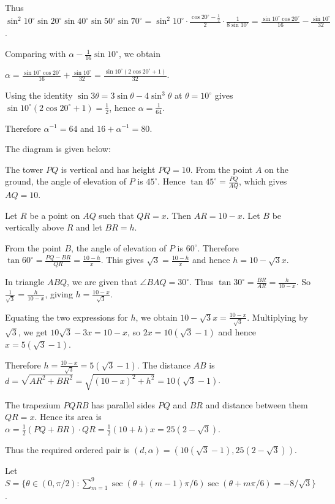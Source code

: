   Thus $\sin^2 10^\circ\sin20^\circ\sin40^\circ\sin50^\circ\sin70^\circ=\sin^2
  10^\circ\cdot\frac{\cos20^\circ-\tfrac12}{2}\cdot\frac{1}{8\sin10^\circ}=\frac{\sin10^\circ\cos20^\circ}{16}-\frac{\sin10^\circ}{32}$.

  Comparing with $\alpha-\frac{1}{16}\sin10^\circ$, we obtain

  $\alpha=\frac{\sin10^\circ\cos20^\circ}{16}+\frac{\sin10^\circ}{32}=\frac{\sin10^\circ(2\cos20^\circ+1)}{32}$.

  Using the identity $\sin3\theta=3\sin\theta-4\sin^3\theta$ at $\theta=10^\circ$ gives
  $\sin10^\circ(2\cos20^\circ+1)=\frac12$, hence $\alpha=\frac{1}{64}$.

  Therefore $\alpha^{-1}=64$ and $16+\alpha^{-1}=80$.
\item The diagram is given below:

  \startplacefigure
    \externalfigure[17_26.pdf]
  \stopplacefigure

  The tower $PQ$ is vertical and has height $PQ=10$.
  From the point $A$ on the ground, the angle of elevation of $P$ is $45^\circ$.
  Hence $\tan 45^\circ=\frac{PQ}{AQ}$, which gives $AQ=10$.

  Let $R$ be a point on $AQ$ such that $QR=x$.
  Then $AR=10-x$.
  Let $B$ be vertically above $R$ and let $BR=h$.

  From the point $B$, the angle of elevation of $P$ is $60^\circ$.
  Therefore $\tan 60^\circ=\frac{PQ-BR}{QR}=\frac{10-h}{x}$.
  This gives $\sqrt3=\frac{10-h}{x}$ and hence $h=10-\sqrt3 x$.

  In triangle $ABQ$, we are given that $\angle BAQ=30^\circ$.
  Thus $\tan 30^\circ=\frac{BR}{AR}=\frac{h}{10-x}$.
  So $\frac1{\sqrt3}=\frac{h}{10-x}$, giving $h=\frac{10-x}{\sqrt3}$.

  Equating the two expressions for $h$, we obtain
  $10-\sqrt3 x=\frac{10-x}{\sqrt3}$.
  Multiplying by $\sqrt3$, we get
  $10\sqrt3-3x=10-x$, so $2x=10(\sqrt3-1)$ and hence
  $x=5(\sqrt3-1)$.

  Therefore $h=\frac{10-x}{\sqrt3}=5(\sqrt3-1)$.
  The distance $AB$ is
  $d=\sqrt{AR^2+BR^2}=\sqrt{(10-x)^2+h^2}=10(\sqrt3-1)$.

  The trapezium $PQRB$ has parallel sides $PQ$ and $BR$ and distance between them $QR=x$.
  Hence its area is
  $\alpha=\frac12(PQ+BR)\cdot QR=\frac12(10+h)x=25(2-\sqrt3)$.

  Thus the required ordered pair is $(d,\alpha)=(10(\sqrt3-1),25(2-\sqrt3))$.
\item Let $S=\{\theta\in(0,\pi/2):\displaystyle\sum_{m=1}^9 \sec(\theta+(m-1)\pi/6)\sec(\theta+m\pi/6)=-8/\sqrt3\}$.

